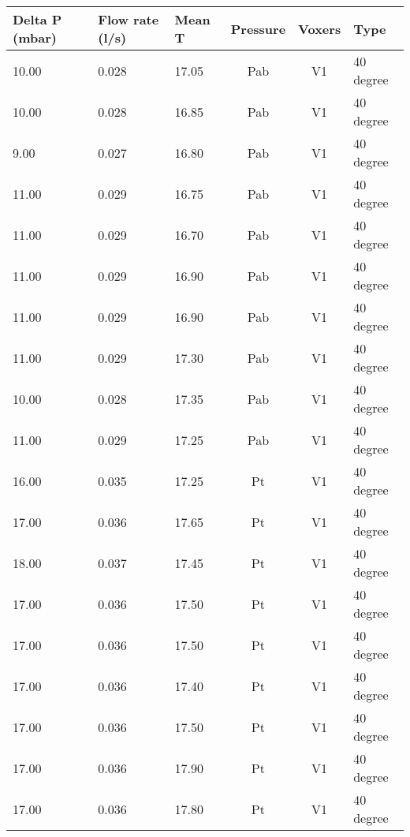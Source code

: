 \begin{table}[t]
\centering
\begin{tabular}{l | l | l | c | c | l}
Delta P (mbar) & Flow rate (l/s) & Mean T & Pressure & Voxers & Type                \\ \hline
10.00          & 0.028           & 17.05  & Pab      & V1     & 40 degree           \\
10.00          & 0.028           & 16.85  & Pab      & V1     & 40 degree           \\
9.00           & 0.027           & 16.80  & Pab      & V1     & 40 degree           \\
11.00          & 0.029           & 16.75  & Pab      & V1     & 40 degree           \\
11.00          & 0.029           & 16.70  & Pab      & V1     & 40 degree           \\
11.00          & 0.029           & 16.90  & Pab      & V1     & 40 degree           \\
11.00          & 0.029           & 16.90  & Pab      & V1     & 40 degree           \\
11.00          & 0.029           & 17.30  & Pab      & V1     & 40 degree           \\
10.00          & 0.028           & 17.35  & Pab      & V1     & 40 degree           \\
11.00          & 0.029           & 17.25  & Pab      & V1     & 40 degree           \\
16.00          & 0.035           & 17.25  & Pt       & V1     & 40 degree           \\
17.00          & 0.036           & 17.65  & Pt       & V1     & 40 degree           \\
18.00          & 0.037           & 17.45  & Pt       & V1     & 40 degree           \\
17.00          & 0.036           & 17.50  & Pt       & V1     & 40 degree           \\
17.00          & 0.036           & 17.50  & Pt       & V1     & 40 degree           \\
17.00          & 0.036           & 17.40  & Pt       & V1     & 40 degree           \\
17.00          & 0.036           & 17.50  & Pt       & V1     & 40 degree           \\
17.00          & 0.036           & 17.90  & Pt       & V1     & 40 degree           \\
17.00          & 0.036           & 17.80  & Pt       & V1     & 40 degree           \\

\end{tabular}
\end{table}

